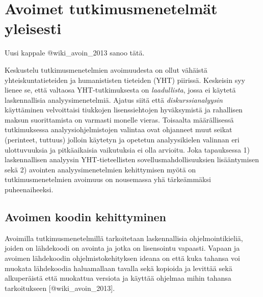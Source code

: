 \section{Avoimet tutkimusmenetelmät
yleisesti}\label{avoimet-tutkimusmenetelmuxe4t-yleisesti}

Uusi kappale @wiki\_avoin\_2013 sanoo tätä.

Keskustelu tutkimusmenetelmien avoimuudesta on ollut vähäistä
yhteiskuntatieteiden ja humanististen tieteiden (YHT) piirissä.
Keskeisin syy lienee se, että valtaosa YHT-tutkimuksesta on
\emph{laadullista}, jossa ei käytetä laskennallisia analyysimenetelmiä.
Ajatus siitä että \emph{diskurssianalyysin} käyttäminen velvoittaisi
tiukkojen lisenssiehtojen hyväksymistä ja rahallisen maksun
suorittamista on varmasti monelle vieras. Toisaalta määrällisessä
tutkimuksessa analyysiohjelmistojen valintaa ovat ohjanneet muut seikat
(perinteet, tuttuus) jolloin käytetyn ja opetetun analyysikielen
valinnan eri ulottuvuuksia ja pitkäaikaisia vaikutuksia ei olla
arvioitu. Joka tapauksessa 1) laskennallisen analyysin YHT-tieteellisten
sovellusmahdollisuuksien lisääntymisen sekä 2) avointen
analyysimenetelmien kehittymisen myötä on tutkimusmenetelmien avoimuus
on nousemassa yhä tärkeämmäksi puheenaiheeksi.

\subsection{Avoimen koodin
kehittyminen}\label{avoimen-koodin-kehittyminen}

Avoimilla tutkimusmenetelmillä tarkoitetaan laskennallisia
ohjelmointikieliä, joiden on lähdekoodi on avointa ja jotka on
lisensointu vapaasti. Vapaan ja avoimen lähdekoodin ohjelmistokehityksen
ideana on että kuka tahansa voi muokata lähdekoodia haluamallaan tavalla
sekä kopioida ja levittää sekä alkuperäistä että muokattua versiota ja
käyttää ohjelmaa mihin tahansa tarkoitukseen {[}@wiki\_avoin\_2013{]}.

